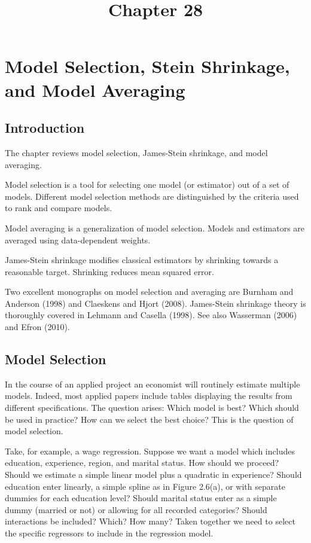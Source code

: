 \documentclass[10pt]{article}
\title{Chapter 28 }
\author{}
\date{}
\begin{document}
\maketitle
\section{Model Selection, Stein Shrinkage, and Model Averaging}
\subsection{Introduction}
The chapter reviews model selection, James-Stein shrinkage, and model averaging.

Model selection is a tool for selecting one model (or estimator) out of a set of models. Different model selection methods are distinguished by the criteria used to rank and compare models.

Model averaging is a generalization of model selection. Models and estimators are averaged using data-dependent weights.

James-Stein shrinkage modifies classical estimators by shrinking towards a reasonable target. Shrinking reduces mean squared error.

Two excellent monographs on model selection and averaging are Burnham and Anderson (1998) and Claeskens and Hjort (2008). James-Stein shrinkage theory is thoroughly covered in Lehmann and Casella (1998). See also Wasserman (2006) and Efron (2010).

\subsection{Model Selection}
In the course of an applied project an economist will routinely estimate multiple models. Indeed, most applied papers include tables displaying the results from different specifications. The question arises: Which model is best? Which should be used in practice? How can we select the best choice? This is the question of model selection.

Take, for example, a wage regression. Suppose we want a model which includes education, experience, region, and marital status. How should we proceed? Should we estimate a simple linear model plus a quadratic in experience? Should education enter linearly, a simple spline as in Figure 2.6(a), or with separate dummies for each education level? Should marital status enter as a simple dummy (married or not) or allowing for all recorded categories? Should interactions be included? Which? How many? Taken together we need to select the specific regressors to include in the regression model.
\end{document}
